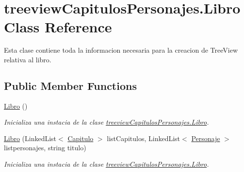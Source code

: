 \hypertarget{classtreeview_capitulos_personajes_1_1_libro}{\section{treeview\-Capitulos\-Personajes.\-Libro Class Reference}
\label{classtreeview_capitulos_personajes_1_1_libro}
}


Esta clase contiene toda la informacion necesaria para la creacion de Tree\-View relativa al libro.  


\subsection*{Public Member Functions}
\begin{DoxyCompactItemize}
\item 
\hyperlink{classtreeview_capitulos_personajes_1_1_libro_accc9be461b110c88b31dac5ed12c3923}{Libro} ()
\begin{DoxyCompactList}\small\item\em Inicializa una instacia de la clase \hyperlink{classtreeview_capitulos_personajes_1_1_libro}{treeview\-Capitulos\-Personajes.\-Libro}. \end{DoxyCompactList}\item 
\hyperlink{classtreeview_capitulos_personajes_1_1_libro_a76287cdb722730724c3c92c82477e42f}{Libro} (Linked\-List$<$ \hyperlink{classtreeview_capitulos_personajes_1_1_capitulo}{Capitulo} $>$ list\-Capitulos, Linked\-List$<$ \hyperlink{classtreeview_capitulos_personajes_1_1_personaje}{Personaje} $>$ listpersonajes, string titulo)
\begin{DoxyCompactList}\small\item\em Inicializa una instacia de la clase \hyperlink{classtreeview_capitulos_personajes_1_1_libro}{treeview\-Capitulos\-Personajes.\-Libro}. \end{DoxyCompactList}\end{DoxyCompactItemize}

